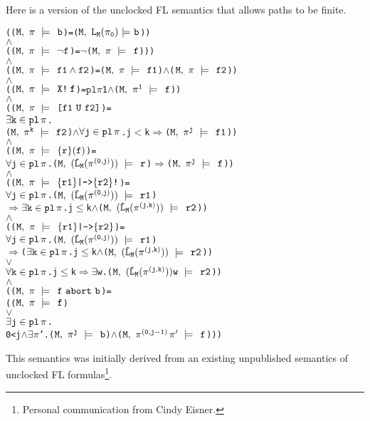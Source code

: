 \documentclass{llncs}
\newcommand{\And}{\(\wedge\)}
\newcommand{\Or}{\(\vee\)}
\newcommand{\Imp}{\(\Rightarrow\)}
\newcommand{\Not}{\(\neg\)}
\newcommand{\Exists}{\(\exists\)}
\newcommand{\pathCat}[2]{#1\hspace*{0.5mm}#2}
\newcommand{\Leq}{\(\leq\)}
\newcommand{\Le}{\(<\)}
\renewcommand{\Pi}{\(\pi\)}
\newcommand{\BSem}[3]{(\(\tt#1,~#2~{\models}~#3\))}
\newcommand{\SSem}[4]{(\(\tt{#1,~#2~\models^{\hspace*{-2.3mm}\raisebox{1mm}{\tt#3}}~#4}\))}
\newcommand{\sSem}[4]{(\tt{#1,~#2~\models^{\hspace*{-2.3mm}\raisebox{1mm}{\tt#3}}~#4})}
\renewcommand{\c}{{\hspace*{2.5mm}}}
\newcommand{\FSem}[4]{(\(\tt{#1,~#2~\models^{\hspace*{-2.3mm}\raisebox{1mm}{\tt#3}}~#4}\))}
\newcommand{\Pl}{\(\texttt{pl}\xspace\)}
\newcommand{\pl}{\texttt{pl}\xspace}
\renewcommand{\sim}{\texttt{sim}\xspace}
\newcommand{\ResExists}[2]{\(\exists{\tt#1}\in\pl\hspace*{0.5mm}#2\)}
\newcommand{\ResForall}[2]{\(\forall{\tt#1}\in\pl\hspace*{0.5mm}#2\)}
\newcommand{\FBool}[1]{#1}
\newcommand{\fNot}[1]{\neg#1}
\newcommand{\restN}[2]{#1^{#2}}
\newcommand{\pathEl}[2]{#1_{#2}}
\newcommand{\pathSeg}[2]{#1^{#2}}
\newcommand{\lHat}[1]{\hat{\texttt{L}}_{#1}}
\newcommand{\lNoHat}[1]{{\texttt{L}}_{#1}}
\newcommand{\fAnd}[2]{#1 \wedge #2}
\newcommand{\fNext}[1]{\texttt{X!}\hspace*{0.8mm}#1}
\newcommand{\fUntil}[2]{\texttt{[}#1~\texttt{U}~#2\texttt{]}}
\newcommand{\fSuffixImp}[2]{\{#1\}(#2)}
\newcommand{\fStrongImp}[2]{\{#1\}\texttt{|->}\{#2\}\texttt{!}}
\newcommand{\fWeakImp}[2]{\{#1\}\texttt{|->}\{#2\}}
\newcommand{\fAbort}[2]{#1~\texttt{abort}~#2}
\begin{document}
Here is a version of the unclocked FL semantics that allows
paths to be finite.


{\begin{alltt}
    ({\FSem{M}{{\pi}}{{\c}}{\FBool{b}}} = {\BSem{M}{\lNoHat{M}(\pathEl{{\pi}}{0})}{b}})
    {\And}
    ({\FSem{M}{{\pi}}{{\c}}{\fNot{f}}} = {\Not}{\FSem{M}{{\pi}}{\c}{f}}))
    {\And}
    ({\FSem{M}{{\pi}}{{\c}}{\fAnd{f1}{f2}}} = {\FSem{M}{\pi}{{\c}}{f1}} {\And} {\FSem{M}{\pi}{{\c}}{f2}})
    {\And}
    ({\FSem{M}{{\pi}}{{\c}}{\fNext{f}}} = {\Pl \Pi 1} \And {\FSem{M}{\restN{{\pi}}{1}}{{\c}}{f}})
    {\And}
    ({\FSem{M}{{\pi}}{{\c}}{\fUntil{f1}{f2}}} = 
      {\ResExists{k}{\pi}}. 
       {\FSem{M}{\restN{{\pi}}{k}}{\c}{f2}} \And {\ResForall{j}{\pi}}. j {\Le} k \Imp {\FSem{M}{\restN{{\pi}}{j}}{{\c}}{f1}})
    {\And}
    ({\FSem{M}{{\pi}}{{\c}}{\fSuffixImp{r}{f}}} = 
      {\ResForall{j}{\pi}}. \SSem{M}{(\lHat{M} (\pathSeg{\pi}{(0,j)}))}{\c}{r} {\Imp} {\FSem{M}{\restN{{\pi}}{j}}{{\c}}{f}})
    {\And}
    ({\FSem{M}{{\pi}}{{\c}}{\fStrongImp{r1}{r2}}} = 
      {\ResForall{j}{\pi}}. \SSem{M}{(\lHat{M} (\pathSeg{\pi}{(0,j)}))}{\c}{r1} 
                {\Imp} {\ResExists{k}{\pi}}. j \Leq k \And \SSem{M}{(\lHat{M} (\pathSeg{\pi}{(j,k)}))}{\c}{r2})
    {\And}
    ({\FSem{M}{{\pi}}{{\c}}{\fWeakImp{r1}{r2}}} = 
      {\ResForall{j}{\pi}}. \SSem{M}{(\lHat{M} (\pathSeg{\pi}{(0,j)}))}{\c}{r1} 
                \Imp ({\ResExists{k}{\pi}}. j \Leq k \And \SSem{M}{(\lHat{M} (\pathSeg{\pi}{(j,k)}))}{\c}{r2})
                   \Or
                   {\ResForall{k}{\pi}}. j \Leq k \Imp {\Exists}w. \SSem{M}{(\lHat{M} (\pathSeg{\pi}{(j,k)}))w}{\c}{r2})
    {\And}
    ({\FSem{M}{{\pi}}{{\c}}{\fAbort{f}{b}}} =
      ({\FSem{M}{\pi}{{\c}}{f }}
       {\Or}
       {\ResExists{j}{\pi}}. 
        0 < j \And \Exists{\Pi}'. {\FSem{M}{\restN{{\pi}}{j}}{\c}{{\FBool{b}}}} {\And} {\FSem{M}{\pathCat{\pathSeg{\pi}{(0,j-1)}}{{\pi}'}}{{\c}}{f}}))
\end{alltt}}

This semantics was initially derived from an existing unpublished semantics of unclocked 
FL formulas\footnote{Personal communication from Cindy Eisner.}.
\end{document}
